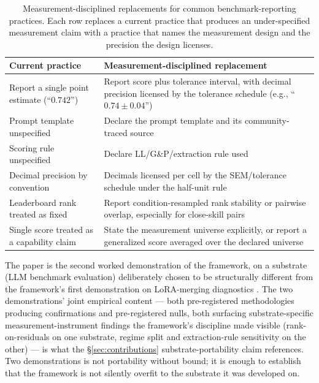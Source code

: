 \documentclass[11pt]{article}
\begin{document}
\begin{table}[h]
\centering
\small
\caption{Measurement-disciplined replacements for common benchmark-reporting practices. Each row replaces a current practice that produces an under-specified measurement claim with a practice that names the measurement design and the precision the design licenses.}
\label{tab:reporting-standard}
\begin{tabular}{p{}p{}}
\toprule
Current practice & Measurement-disciplined replacement \\
\midrule
Report a single point estimate (``$0.742$'') & Report score plus tolerance interval, with decimal precision licensed by the tolerance schedule (e.g., ``$0.74 \pm 0.04$'') \\
Prompt template unspecified & Declare the prompt template and its community-traced source \\
Scoring rule unspecified & Declare LL/G\&P/extraction rule used \\
Decimal precision by convention & Decimals licensed per cell by the SEM/tolerance schedule under the half-unit rule \\
Leaderboard rank treated as fixed & Report condition-resampled rank stability or pairwise overlap, especially for close-skill pairs \\
Single score treated as a capability claim & State the measurement universe explicitly, or report a generalized score averaged over the declared universe \\
\bottomrule
\end{tabular}
\end{table}

The paper is the second worked demonstration of the framework, on a substrate (LLM benchmark evaluation) deliberately chosen to be structurally different from the framework's first demonstration on LoRA-merging diagnostics \citep{anonymized2026n134}. The two demonstrations' joint empirical content --- both pre-registered methodologies producing confirmations and pre-registered nulls, both surfacing substrate-specific measurement-instrument findings the framework's discipline made visible (rank-on-residuals on one substrate, regime split and extraction-rule sensitivity on the other) --- is what the §\ref{sec:contributions} substrate-portability claim references. Two demonstrations is not portability without bound; it is enough to establish that the framework is not silently overfit to the substrate it was developed on.

\end{document}
